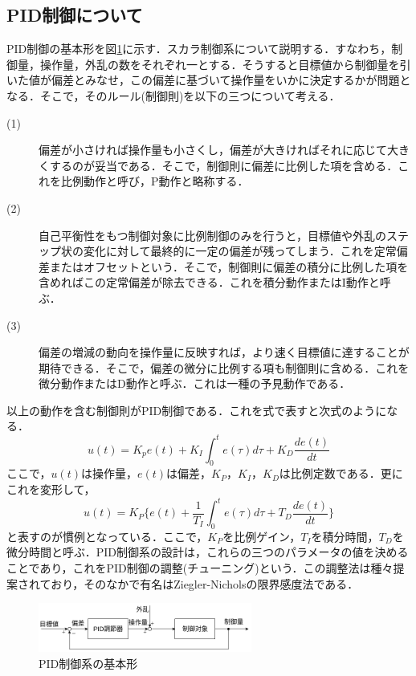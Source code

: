 \documentclass[12pt]{jsarticle}
\begin{document}
\subsection{PID制御について}
PID制御の基本形を図\ref{PID-normal-form}に示す．スカラ制御系について説明する．すなわち，制御量，操作量，外乱の数をそれぞれ一とする．そうすると目標値から制御量を引いた値が偏差とみなせ，この偏差に基づいて操作量をいかに決定するかが問題となる．そこで，そのルール(制御則)を以下の三つについて考える．
\begin{description}
  \item[(1)] 偏差が小さければ操作量も小さくし，偏差が大きければそれに応じて大きくするのが妥当である．そこで，制御則に偏差に比例した項を含める．これを比例動作と呼び，P動作と略称する．
  \item[(2)] 自己平衡性をもつ制御対象に比例制御のみを行うと，目標値や外乱のステップ状の変化に対して最終的に一定の偏差が残ってしまう．これを定常偏差またはオフセットという．そこで，制御則に偏差の積分に比例した項を含めればこの定常偏差が除去できる．これを積分動作またはI動作と呼ぶ．
  \item[(3)] 偏差の増減の動向を操作量に反映すれば，より速く目標値に達することが期待できる．そこで，偏差の微分に比例する項も制御則に含める．これを微分動作またはD動作と呼ぶ．これは一種の予見動作である．
\end{description}
以上の動作を含む制御則がPID制御である．これを式で表すと次式のようになる．
\begin{equation}
  \label{}
  u(t) = K_p e(t) + K_I\int^t_0 e(\tau) d\tau + K_D \frac{de(t)}{dt}
\end{equation}
ここで，$u(t)$は操作量，$e(t)$は偏差，$K_P$，$K_I$，$K_D$は比例定数である．更にこれを変形して，
\begin{equation}
  \label{}
  u(t) = K_P\{ e(t) + \frac{1}{T_I}\int^t_0 e(\tau) d\tau + T_D\frac{de(t)}{dt}\}
\end{equation}
と表すのが慣例となっている．ここで，$K_P$を比例ゲイン，$T_I$を積分時間，$T_D$を微分時間と呼ぶ．PID制御系の設計は，これらの三つのパラメータの値を決めることであり，これをPID制御の調整(チューニング)という．この調整法は種々提案されており，そのなかで有名はZiegler-Nicholsの限界感度法である．
\begin{figure}[tb]
  \begin{center}
    \includegraphics[clip,width=7.0cm]{../img/2-A1.png}
    \caption{PID制御系の基本形}
    \label{PID-normal-form}
  \end{center}
\end{figure}
\end{document}

